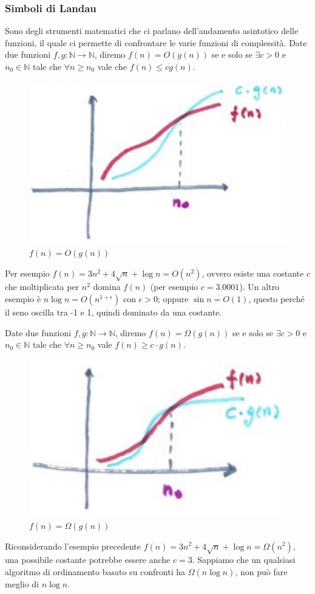 \documentclass{article}
\begin{document}
\subsubsection{Simboli di Landau}
Sono degli strumenti matematici che ci parlano dell'andamento asintotico delle funzioni, il
quale ci permette di confrontare le varie funzioni di complessità. Date due funzioni $f,g:\mathbb{N}\rightarrow\mathbb{N}$,
diremo $f(n)=O(g(n))$ se e solo se $\exists c>0$ e $n_0\in\mathbb{N}$ tale che $\forall n\geq n_0$
vale che $f(n)\leq c\dot g(n)$.
\begin{figure}[H]
    \centering
    \includegraphics[scale=0.5]{images/ogrande.png}
    \caption{$f(n)=O(g(n))$}
\end{figure}
Per esempio $f(n)=3n^2+4\sqrt{n}+\log n=O(n^2)$, ovvero esiste una costante $c$ che moltiplicata
per $n^2$ domina $f(n)$ (per esempio $c=3.0001$). Un altro esempio è $n\log n=O(n^{1+\epsilon})$
con $\epsilon>0$; oppure $\sin n = O(1)$, questo perché il seno oscilla tra -1 e 1,
quindi dominato da una costante.

Date due funzioni $f,g:\mathbb{N}\rightarrow\mathbb{N}$, diremo $f(n)=\Omega(g(n))$ se e solo
se $\exists c>0$ e $n_0\in\mathbb{N}$ tale che $\forall n\geq n_0$ vale $f(n)\geq c\cdot g(n)$.
\begin{figure}[H]
    \centering
    \includegraphics[scale=0.5]{images/omegagrande.png}
    \caption{$f(n)=\Omega (g(n))$}
\end{figure}
Riconsiderando l'esempio precedente $f(n)=3n^2+4\sqrt{n}+\log n=\Omega(n^2)$, una possibile
costante potrebbe essere anche $c=3$. Sappiamo che un qualsiasi algoritmo di ordinamento
basato su confronti ha $\Omega (n\log n)$, non può fare meglio di $n\log n$. 
\end{document}
